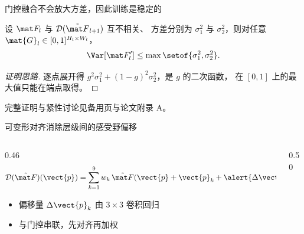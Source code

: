 \begin{frame}{门控融合不会放大方差，因此训练是稳定的}
  \begin{theorem}[方差不增]
    设 $\featmap_l$ 与 $\mathcal{D}(\tilde{\featmap}_{l+1})$ 互不相关、
    方差分别为 $\sigma_1^2$ 与 $\sigma_2^2$，则对任意
    $\mat{G}_l \in [0,1]^{H_l \times W_l}$，
    \begin{equation*}
      \Var\!\left[\featmap_l'\right] \le \max\setof{\sigma_1^2, \sigma_2^2}.
    \end{equation*}
  \end{theorem}

  \pause
  \vspace{0.6em}
  \begin{proof}[证明思路]
    逐点展开得 $g^2\sigma_1^2 + (1-g)^2\sigma_2^2$，是 $g$ 的二次函数，
    在 $[0,1]$ 上的最大值只能在端点取得。\qedhere
  \end{proof}

  \vspace{0.4em}
  {\footnotesize\color{AcadMuted}
   完整证明与紧性讨论见备用页与论文附录 A。}

\end{frame}

\begin{frame}{可变形对齐消除层级间的感受野偏移}
  \begin{columns}[T, onlytextwidth]
    \begin{column}{0.46\textwidth}
      \begin{equation*}
        \mathcal{D}(\tilde{\featmap})(\vect{p})
          = \sum_{k=1}^{9} w_k\,
            \tilde{\featmap}\!\left(\vect{p} + \vect{p}_k
                                    + \alert{\Delta \vect{p}_k}\right)
      \end{equation*}
      \vspace{0.5em}
      \begin{itemize}
        \setlength{\itemsep}{0.6em}
        \item 偏移量 $\Delta \vect{p}_k$ 由 $3\times3$ 卷积回归
        \item 与门控串联，先对齐再加权
      \end{itemize}
    \end{column}
    \begin{column}{0.50\textwidth}
      \centering
    \end{column}
  \end{columns}
\end{frame}
